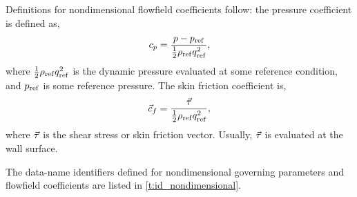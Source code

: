 Definitions for nondimensional flowfield coefficients follow: the
pressure coefficient is defined as,
$$
 c_p = {p - p_{\rm ref} \over {1\over2} \rho_{\rm ref} q_{\rm ref}^2},
$$
where ${1\over2} \rho_{\rm ref} q_{\rm ref}^2$ is the dynamic pressure evaluated at
some reference condition, and $p_{\rm ref}$ is some reference pressure.  The 
skin friction coefficient is,
$$
 {\vec{c}}_f = {{\vec{\tau}} \over {1\over2} \rho_{\rm ref} q_{\rm ref}^2},
$$
where ${\vec{\tau}}$ is the shear stress or skin friction vector.  Usually, 
${\vec{\tau}}$ is evaluated at the wall surface.

The data-name identifiers defined for nondimensional governing
parameters and flowfield coefficients are listed in
\autoref{t:id_nondimensional}.

\renewcommand{\thetable}{\thesection.5}
\settowidth{\tmplengthb}{$\M \L/(\T^3 \TH)$}
\setlength{\LTleft}{0pt}
\setlength{\LTright}{0pt}
\setlength{\Pwidth}{\linewidth-6\tabcolsep-\tmplengtha-\tmplengthb}
